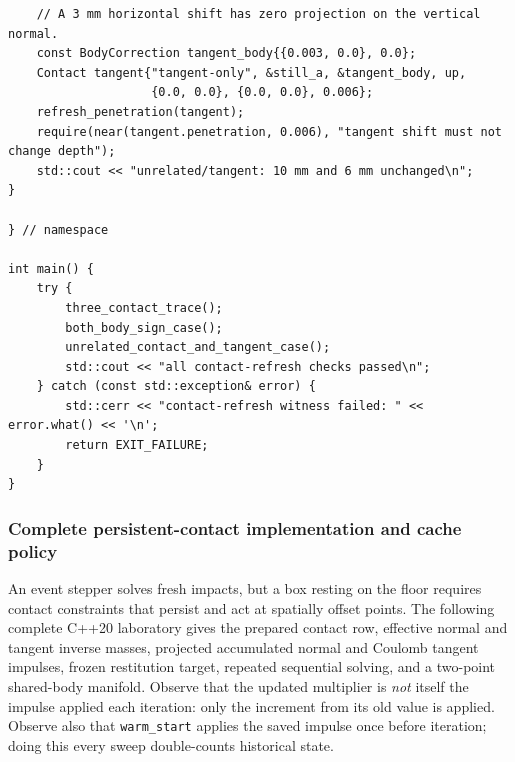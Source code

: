 \begin{verbatim}
    // A 3 mm horizontal shift has zero projection on the vertical normal.
    const BodyCorrection tangent_body{{0.003, 0.0}, 0.0};
    Contact tangent{"tangent-only", &still_a, &tangent_body, up,
                    {0.0, 0.0}, {0.0, 0.0}, 0.006};
    refresh_penetration(tangent);
    require(near(tangent.penetration, 0.006), "tangent shift must not change depth");
    std::cout << "unrelated/tangent: 10 mm and 6 mm unchanged\n";
}

} // namespace

int main() {
    try {
        three_contact_trace();
        both_body_sign_case();
        unrelated_contact_and_tangent_case();
        std::cout << "all contact-refresh checks passed\n";
    } catch (const std::exception& error) {
        std::cerr << "contact-refresh witness failed: " << error.what() << '\n';
        return EXIT_FAILURE;
    }
}
\end{verbatim}

\subsubsection{Complete persistent-contact implementation and cache policy}\label{06-engine-ii-ch046-complete-persistent-contact-implementation-and-cache-policy}

\hypertarget{06-engine-ii-ch046-complete-persistent-contact-implementation-and-cache-policy}{}

An event stepper solves fresh impacts, but a box resting on the floor requires contact constraints that persist and act at spatially offset points. The following complete C++20 laboratory gives the prepared contact row, effective normal and tangent inverse masses, projected accumulated normal and Coulomb tangent impulses, frozen restitution target, repeated sequential solving, and a two-point shared-body manifold. Observe that the updated multiplier is \emph{not} itself the impulse applied each iteration: only the increment from its old value is applied. Observe also that \texttt{warm\_start} applies the saved impulse once before iteration; doing this every sweep double-counts historical state.

